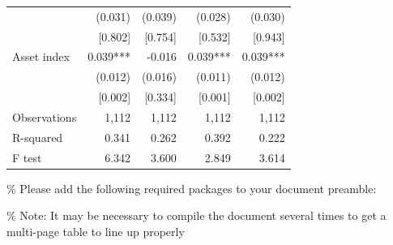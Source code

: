 \documentclass[
]{article}
\begin{document}
\begin{ThreePartTable}
\begin{longtable}[t]{lrrrr}
 & (0.031) & (0.039) & (0.028) & (0.030)\\
 & {}[0.802] & {}[0.754] & {}[0.532] & {}[0.943]\\
Asset index & 0.039*** & -0.016 & 0.039*** & 0.039***\\
 & (0.012) & (0.016) & (0.011) & (0.012)\\
 & {}[0.002] & {}[0.334] & {}[0.001] & {}[0.002]\\
Observations & 1,112 & 1,112 & 1,112 & 1,112\\
R-squared & 0.341 & 0.262 & 0.392 & 0.222\\
F test & 6.342 & 3.600 & 2.849 & 3.614\\*
\end{longtable}
\end{ThreePartTable}
\endgroup{}

\% Please add the following required packages to your document preamble:

\% Note: It may be necessary to compile the document several times to get a multi-page table to line up properly
\end{document}
